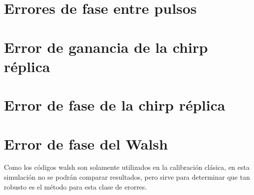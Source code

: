 \section{Errores de fase entre pulsos}
\section{Error de ganancia de la chirp réplica}
\section{Error de fase de la chirp réplica}
\section{Error de fase del Walsh}

Como los códigos walsh son solamente utilizados en la calibración clásica, en esta simulación no se podrán comparar 
resultados, pero sirve para determinar que tan robusto es el método para esta clase de erorres.
